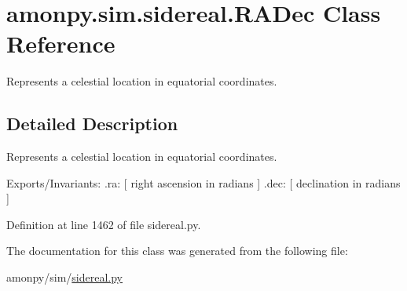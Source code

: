 \hypertarget{classamonpy_1_1sim_1_1sidereal_1_1_r_a_dec}{\section{amonpy.\-sim.\-sidereal.\-R\-A\-Dec Class Reference}
\label{classamonpy_1_1sim_1_1sidereal_1_1_r_a_dec}
}


Represents a celestial location in equatorial coordinates.  




\subsection{Detailed Description}
Represents a celestial location in equatorial coordinates. 

Exports/\-Invariants\-: .ra\-: \mbox{[} right ascension in radians \mbox{]} .dec\-: \mbox{[} declination in radians \mbox{]} 

Definition at line 1462 of file sidereal.\-py.



The documentation for this class was generated from the following file\-:\begin{DoxyCompactItemize}
\item 
amonpy/sim/\hyperlink{sidereal_8py}{sidereal.\-py}\end{DoxyCompactItemize}
